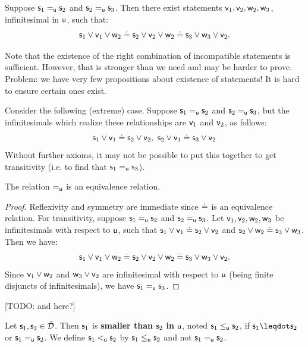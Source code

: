 \documentclass[10pt, onecolumn, nofootinbib]{revtex4-1}
\begin{document}
\begin{prop}
	Suppose $\stmt_1\equ\stmt_2$ and $\stmt_2\equ\stmt_3$. Then there exist statements  $\stmt[v]_1,\stmt[v]_2,\stmt[w]_2,\stmt[w]_3$, infinitesimal in $\stmt[u]$, such that:
	$$
	\stmt_1\OR\stmt[v]_1\OR\stmt[w]_2 \eqgran \stmt_2\OR\stmt[v]_2\OR\stmt[w]_2 \eqgran \stmt_3\OR\stmt[w]_3\OR\stmt[v]_2.
	$$
\end{prop}

Note that the existence of the right combination of incompatible statements is sufficient. However, that is stronger than we need and may be harder to prove. Problem: we have very few propositions about existence of statements! It is hard to ensure certain ones exist. 

Consider the following (extreme) case. Suppose $\stmt_1\equ\stmt_2$ and $\stmt_2\equ\stmt_3$, but the infinitesimals which realize these relationships are $\stmt[v]_1$ and $\stmt[v]_2$, as follows:
$$
\stmt_1\OR\stmt[v]_1 \eqgran \stmt_2\OR\stmt[v]_2,\ \stmt_2\OR\stmt[v]_1\eqgran\stmt_3\OR\stmt[v]_2
$$
Without further axioms, it may not be possible to put this together to get transitivity (i.e. to find that $\stmt_1\equ\stmt_3$). 


\begin{prop}
	The relation $\equ$ is an equivalence relation.
\end{prop}
\begin{proof}
	Reflexivity and symmetry are immediate since $\eqgran$ is an equivalence relation. For transitivity, suppose $\stmt_1\equ\stmt_2$ and $\stmt_2\equ\stmt_3$. Let $\stmt[v]_1,\stmt[v]_2,\stmt[w]_2,\stmt[w]_3$ be infinitesimals with respect to $\stmt[u]$, such that $\stmt_1\OR\stmt[v]_1\eqgran\stmt_2\OR\stmt[v]_2$ and $\stmt_2\OR\stmt[w]_2\eqgran\stmt_3\OR\stmt[w]_3$. Then we have:
	$$
	\stmt_1\OR\stmt[v]_1\OR\stmt[w]_2 \eqgran \stmt_2\OR\stmt[v]_2\OR\stmt[w]_2 \eqgran \stmt_3\OR\stmt[w]_3\OR\stmt[v]_2.
	$$
	Since $\stmt[v]_1\OR\stmt[w]_2$ and $\stmt[w]_3\OR\stmt[v]_2$ are infinitesimal with respect to $\stmt[u]$ (being finite disjuncts of infinitesimals), we have $\stmt_1\equ\stmt_3$. 
\end{proof}

[TODO: and here?]

\begin{defn}\label{smalleru}
	Let $\stmt_1, \stmt_2 \in \tdomain$. Then $\stmt_1$ is \textbf{smaller than} $\stmt_2$ \textbf{in} $\stmt[u]$, noted $\stmt_1 \lequ \stmt_2$, if $\stmt_1 \finer \stmt_2$ or $\stmt_1 \equ \stmt_2$. We define $\stmt_1\leu\stmt_2$ by $\stmt_1\lequ\stmt_2$ and not $\stmt_1\equ\stmt_2$. 
\end{defn}
\end{document}
